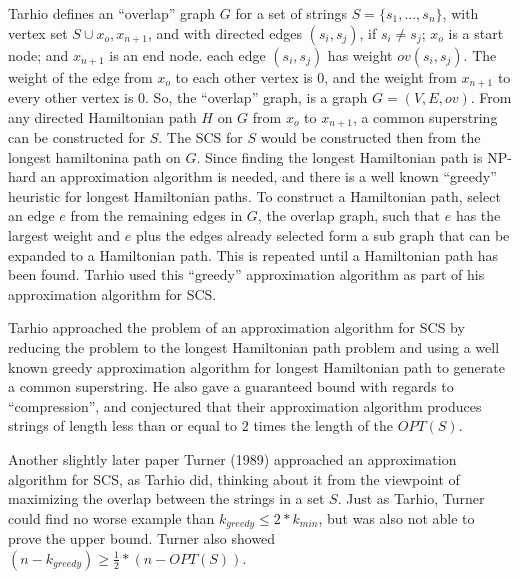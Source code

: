 \documentclass[letterpaper,11pt,titlepage]{article}
\begin{document}
Tarhio defines an ``overlap'' graph $G$ for a set of strings $S = \{s_1, ... ,s_n\}$, with vertex set $S \cup {x_o, x_{n+1}}$, and with directed edges $(s_i, s_j)$, if $s_i \neq s_j$;  $x_o$ is a start node; and $x_{n+1}$ is an end node.  each edge $(s_i, s_j)$ has weight $ov(s_i, s_j)$.  The weight of the edge from $x_o$ to each other vertex is $0$, and the weight from $x_{n+1}$ to every other vertex is $0$.  So, the ``overlap'' graph, is a graph $G = (V, E, ov)$.  From any directed Hamiltonian path $H$ on $G$ from $x_o$ to $x_{n+1}$, a common superstring can be constructed for $S$.  The SCS for $S$ would be constructed then from the longest hamiltonina path on $G$. Since finding the longest Hamiltonian path is NP-hard an approximation algorithm is needed, and there is a well known ``greedy'' heuristic for longest Hamiltonian paths.  To construct a Hamiltonian path, select an edge $e$ from the remaining edges in $G$, the overlap graph, such that $e$ has the largest weight and $e$ plus the edges already selected form a sub graph that can be expanded to a Hamiltonian path.  This is repeated until a Hamiltonian path has been found.  Tarhio used this ``greedy'' approximation algorithm as part of his approximation algorithm for SCS.

Tarhio approached the problem of an approximation algorithm for SCS by reducing the problem to the longest Hamiltonian path problem and using a well known greedy approximation algorithm for longest Hamiltonian path to generate a common superstring. He also gave a guaranteed bound with regards to ``compression'',  and conjectured  that their approximation algorithm produces strings of length less than or equal to $2$ times the length of the $OPT(S)$.  

Another slightly later paper Turner (1989) \cite{turner1989approximation} approached an approximation algorithm for SCS, as Tarhio did, thinking about it from the viewpoint of maximizing the overlap between the strings in a set $S$.  Just as Tarhio, Turner could find no worse example than $k_{greedy} \leq 2* k_{min}$, but was also not able to prove the upper bound.  Turner also showed $(n - k_{greedy}) \geq \frac{1}{2}*(n - OPT(S))$. 
\end{document}
